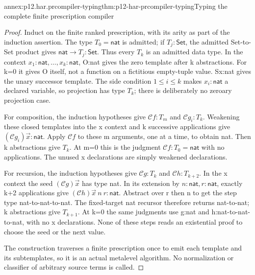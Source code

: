 \begin{annexitem}{annex:p12.har.prcompiler-typing}{thm:p12-har-prcompiler-typing}{Typing the complete finite prescription compiler}
\begin{proof}
Induct on the finite ranked prescription, with its arity as part of the
induction assertion. The type \(T_0=\mathsf{nat}\) is admitted; if
\(T_j:\mathsf{Set}\), the admitted Set-to-Set product gives
\(\mathsf{nat}\to T_j:\mathsf{Set}\). Thus every \(T_k\) is
an admitted data type. In the context
\(x_1:\mathsf{nat},\ldots,x_k:\mathsf{nat}\), O:nat gives the
zero template after k abstractions. For k=0 it gives O itself, not a
function on a fictitious empty-tuple value. Sx:nat gives the unary
successor template. The side condition \(1\le i\le k\) makes
\(x_i:\mathsf{nat}\) a declared variable, so projection has type
\(T_k\); there is deliberately no zeroary projection case.

For composition, the induction hypotheses give
\(\mathcal C f:T_m\) and \(\mathcal C g_i:T_k\). Weakening
these closed templates into the x context and k successive applications
give \((\mathcal C g_i)\vec x:\mathsf{nat}\). Apply
\(\mathcal C f\) to these m arguments, one at a time, to obtain nat.
Then k abstractions give \(T_k\). At m=0 this is the judgment
\(\mathcal C f:T_0=\mathsf{nat}\) with no applications. The
unused x declarations are simply weakened declarations.

For recursion, the induction hypotheses give \(\mathcal C g:T_k\)
and \(\mathcal C h:T_{k+2}\). In the x context the seed
\((\mathcal C g)\vec x\) has type nat. In its extension by
\(n:\mathsf{nat},r:\mathsf{nat}\), exactly k+2 applications give
\((\mathcal C h)\vec x\ n\ r:\mathsf{nat}\). Abstract over r
then n to get the step type nat-to-nat-to-nat. The fixed-target nat
recursor therefore returns nat-to-nat; k abstractions give
\(T_{k+1}\). At k=0 the same judgments use g:nat and
h:nat-to-nat-to-nat, with no x declarations. None of these steps reads
an existential proof to choose the seed or the next value.

The construction traverses a finite prescription once to emit each
template and its subtemplates, so it is an actual metalevel algorithm.
No normalization or classifier of arbitrary source terms is called.
\end{proof}
\end{annexitem}

